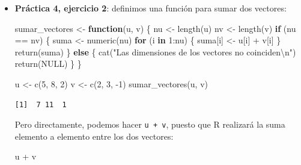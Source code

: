 \documentclass[
]{book}
\newenvironment{Shaded}{\begin{snugshade}}{\end{snugshade}}
\newcommand{\ConstantTok}[1]{\textcolor[rgb]{0.00,0.00,0.00}{#1}}
\newcommand{\ControlFlowTok}[1]{\textcolor[rgb]{0.13,0.29,0.53}{\textbf{#1}}}
\newcommand{\DecValTok}[1]{\textcolor[rgb]{0.00,0.00,0.81}{#1}}
\newcommand{\FunctionTok}[1]{\textcolor[rgb]{0.00,0.00,0.00}{#1}}
\newcommand{\NormalTok}[1]{#1}
\newcommand{\OtherTok}[1]{\textcolor[rgb]{0.56,0.35,0.01}{#1}}
\newcommand{\SpecialCharTok}[1]{\textcolor[rgb]{0.00,0.00,0.00}{#1}}
\newcommand{\StringTok}[1]{\textcolor[rgb]{0.31,0.60,0.02}{#1}}
\begin{document}
\begin{itemize}
\item
  \textbf{Práctica 4, ejercicio 2}: definimos una función para sumar dos vectores:

\begin{Shaded}
\begin{Highlighting}[]
\NormalTok{sumar\_vectores }\OtherTok{\textless{}{-}} \ControlFlowTok{function}\NormalTok{(u, v) \{}
\NormalTok{    nu }\OtherTok{\textless{}{-}} \FunctionTok{length}\NormalTok{(u)}
\NormalTok{    nv }\OtherTok{\textless{}{-}} \FunctionTok{length}\NormalTok{(v)}
    \ControlFlowTok{if}\NormalTok{ (nu }\SpecialCharTok{==}\NormalTok{ nv) \{}
\NormalTok{        suma }\OtherTok{\textless{}{-}} \FunctionTok{numeric}\NormalTok{(nu)}
        \ControlFlowTok{for}\NormalTok{ (i }\ControlFlowTok{in} \DecValTok{1}\SpecialCharTok{:}\NormalTok{nu) \{ }
\NormalTok{            suma[i] }\OtherTok{\textless{}{-}}\NormalTok{ u[i] }\SpecialCharTok{+}\NormalTok{ v[i]}
\NormalTok{        \}}
        \FunctionTok{return}\NormalTok{(suma)}
\NormalTok{    \} }\ControlFlowTok{else}\NormalTok{ \{}
        \FunctionTok{cat}\NormalTok{(}\StringTok{"Las dimensiones de los vectores no coinciden}\SpecialCharTok{\textbackslash{}n}\StringTok{"}\NormalTok{)}
        \FunctionTok{return}\NormalTok{(}\ConstantTok{NULL}\NormalTok{)}
\NormalTok{    \}}
\NormalTok{\}}

\NormalTok{u }\OtherTok{\textless{}{-}} \FunctionTok{c}\NormalTok{(}\DecValTok{5}\NormalTok{, }\DecValTok{8}\NormalTok{, }\DecValTok{2}\NormalTok{)}
\NormalTok{v }\OtherTok{\textless{}{-}} \FunctionTok{c}\NormalTok{(}\DecValTok{2}\NormalTok{, }\DecValTok{3}\NormalTok{, }\SpecialCharTok{{-}}\DecValTok{1}\NormalTok{)}
\FunctionTok{sumar\_vectores}\NormalTok{(u, v)}
\end{Highlighting}
\end{Shaded}

\begin{verbatim}
[1]  7 11  1
\end{verbatim}

  Pero directamente, podemos hacer \texttt{u\ +\ v}, puesto que R realizará la suma elemento a elemento entre los dos vectores:

\begin{Shaded}
\begin{Highlighting}[]
\NormalTok{u }\SpecialCharTok{+}\NormalTok{ v}
\end{Highlighting}
\end{Shaded}


\end{itemize}
\end{document}
